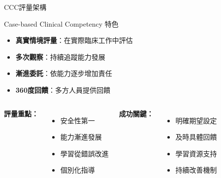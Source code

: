\documentclass[aspectratio=169]{beamer}
\begin{document}
\begin{frame}{CCC評量架構}
\begin{block}{Case-based Clinical Competency 特色}
\begin{itemize}
\item \textbf{真實情境評量}：在實際臨床工作中評估
\item \textbf{多次觀察}：持續追蹤能力發展
\item \textbf{漸進委託}：依能力逐步增加責任
\item \textbf{360度回饋}：多方人員提供回饋
\end{itemize}
\end{block}

\vspace{0.5cm}

\begin{columns}[c]
\textbf{評量重點：}
\begin{itemize}
\item 安全性第一
\item 能力漸進發展
\item 學習從錯誤改進
\item 個別化指導
\end{itemize}

\textbf{成功關鍵：}
\begin{itemize}
\item 明確期望設定
\item 及時具體回饋
\item 學習資源支持
\item 持續改善機制
\end{itemize}
\end{columns}
\end{frame}
\end{document}
